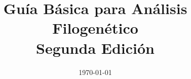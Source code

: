 \usepackage [english,spanish,activeacute]{babel}
\usepackage[utf8x]{inputenc}
\usepackage{tikz}
\usepackage{amsmath}
\usepackage{amsfonts}
\usepackage{amssymb,latexsym}
\usepackage[Sonny]{fncychap}
\usepackage{fancyhdr}
\usepackage{enumitem}


\usepackage{makeidx}
\makeindex
\pagestyle{fancy}

\usepackage[right=2.5cm,left=2.5cm,top=3.5cm,bottom=3.0cm,headsep=1cm,footskip=1.0cm]{geometry}



%
\hypersetup{%
%
      pdfcreator=Rafael Miranda-Esquivel,%
%
   }

\renewcommand{\baselinestretch}{0.75}

\usepackage{setspace}

\doublespacing{}

\setlength{\parindent}{0pt}



\large
\title{Gu\'ia B\'asica para An\'alisis Filogen\'etico\\Segunda Edici\'on}

% 

\date{\today}

